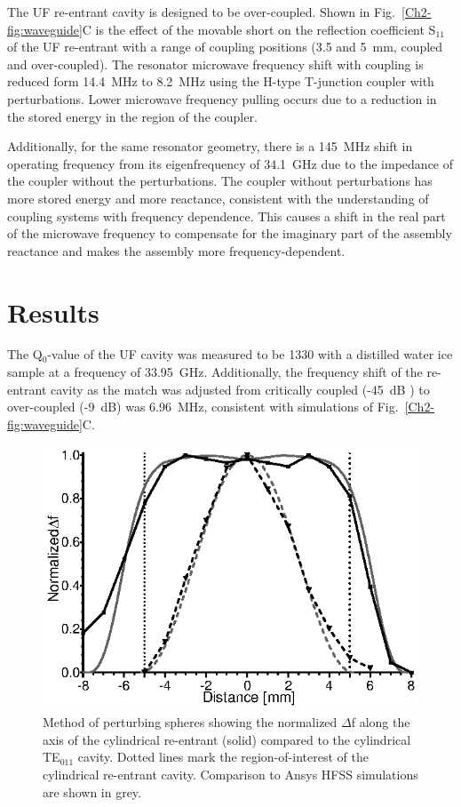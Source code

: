The UF re-entrant \cylTE{} cavity is designed to be over-coupled. Shown in Fig.~\ref{Ch2-fig:waveguide}C is the effect of the movable short on the reflection coefficient S$_{\text{11}}$ of the UF re-entrant \cylTE{} with a range of coupling positions (3.5 and 5~mm, coupled and over-coupled). The resonator microwave frequency shift with coupling is reduced form 14.4~MHz to 8.2~MHz using the H-type T-junction coupler with perturbations. Lower microwave frequency pulling occurs due to a reduction in the stored energy in the region of the coupler. 

Additionally, for the same resonator geometry, there is a 145~MHz shift in operating frequency from its eigenfrequency of 34.1~GHz due to the impedance of the coupler without the perturbations. The coupler without perturbations has more stored energy and more reactance, consistent with the understanding of coupling systems with frequency dependence. \cite{Mett2009} This causes a shift in the real part of the microwave frequency to compensate for the imaginary part of the assembly reactance and makes the assembly more frequency-dependent. 

\section{Results}
The Q$_0$-value of the UF cavity was measured to be 1330 with a distilled water ice sample at a frequency of 33.95~GHz. Additionally, the frequency shift of the re-entrant \cylTE{} cavity as the match was adjusted from critically coupled (-45~dB ) to over-coupled (-9~dB) was 6.96~MHz, consistent with simulations of Fig.~\ref{Ch2-fig:waveguide}C. 

\begin{figure}[htb]\centering
 \includegraphics{Kapitel/Ch2-Images/05-TE01Uperturb.eps}
 \caption[Measured magnetic field using perturbing spheres.]{Method of perturbing spheres showing the normalized $\Delta$f along the axis of the cylindrical re-entrant \cylTE{} (solid) compared to the cylindrical TE$_{\text{011}}$ cavity. Dotted lines mark the region-of-interest of the cylindrical re-entrant \cylTE{} cavity.  Comparison to Ansys HFSS simulations are shown in grey.}
 \label{Ch2-fig:perturb}
\end{figure}

